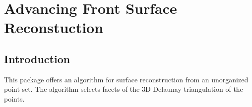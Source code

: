 \chapter{Advancing Front Surface Reconstuction}
\label{chap:surface_reconstruction}


\section{Introduction}

This package offers an algorithm for surface reconstruction from an unorganized point set.
The algorithm selects facets of the 3D Delaunay triangulation of the points.




